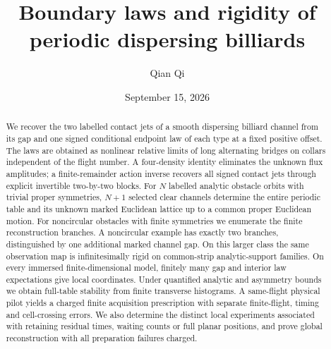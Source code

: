 
\title[Boundary laws and periodic rigidity]{Boundary laws and rigidity of periodic dispersing billiards}
\author{Qian Qi}
\date{September 15, 2026}

\begin{abstract}
We recover the two labelled contact jets of a smooth dispersing billiard
channel from its gap and one signed conditional endpoint law of each type
at a fixed positive offset.  The laws are obtained as nonlinear relative
limits of long alternating bridges on collars independent of the flight
number.  A four-density identity eliminates the unknown flux amplitudes;
a finite-remainder action inverse recovers all signed contact jets through
explicit invertible two-by-two blocks.  For $N$ labelled analytic obstacle
orbits with trivial proper symmetries, $N+1$ selected clear channels
determine the entire periodic table and its unknown marked Euclidean
lattice up to a common proper Euclidean motion.  For noncircular obstacles
with finite symmetries we enumerate the finite reconstruction branches.
A noncircular example has exactly two branches, distinguished by one
additional marked channel gap.
On this larger class the same observation map is infinitesimally rigid
on common-strip analytic-support families.  On
every immersed finite-dimensional model, finitely many gap and interior
law expectations give local coordinates.  Under quantified analytic and
asymmetry bounds we obtain full-table stability from finite transverse
histograms.  A same-flight physical pilot yields a charged finite
acquisition prescription with separate finite-flight, timing and
cell-crossing errors.  We also determine the distinct local experiments
associated with retaining residual times, waiting counts or full planar
positions, and prove global reconstruction with all preparation failures
charged.
\end{abstract}
\makeatletter
\def\@setabstracta{%
  \ifvoid\abstractbox\else
    \skip@20\p@ \advance\skip@-\lastskip
    \advance\skip@-\baselineskip \vskip\skip@
    \unvbox\abstractbox \prevdepth\z@
  \fi}
\makeatother
\maketitle
\setcounter{tocdepth}{1}
\tableofcontents


